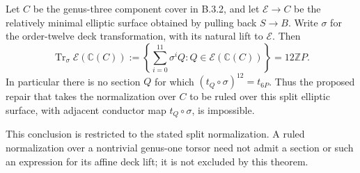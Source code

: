 \begin{theorem}\label{push:src:B.3.4}\label{push:B34}
Let $C$ be the genus-three component cover
in B.3.2, and let $\mathscr E\to C$ be
the relatively minimal elliptic surface
obtained by pulling back $S\to B$.
Write $\sigma$ for the order-twelve deck
transformation, with its natural lift to
$\mathscr E$. Then
\[
 \operatorname{Tr}_{\sigma}
   \mathscr E(\mathbb C(C))
 :=\left\{\sum_{i=0}^{11}\sigma^i Q:
                 Q\in\mathscr E(\mathbb C(C))\right\}
 =12\mathbb Z P.
\]
In particular there is no section $Q$
for which $(t_Q\circ\sigma)^{12}=t_{6P}$.
Thus the proposed repair that takes the
normalization over $C$ to be ruled over
this split elliptic surface, with adjacent
conductor map $t_Q\circ\sigma$, is
impossible.

This conclusion is restricted to the
stated split normalization. A ruled
normalization over a nontrivial genus-one
torsor need not admit a section or such
an expression for its affine deck lift;
it is not excluded by this theorem.
\end{theorem}
